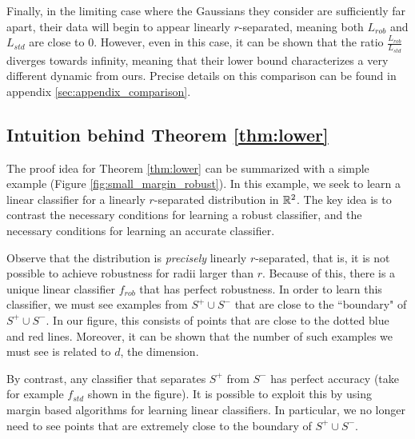 Finally, in the limiting case where the Gaussians they consider are sufficiently far apart, their data will begin to appear linearly $r$-separated, meaning both $L_{rob}$ and $L_{std}$ are close to $0$. However, even in this case, it can be shown that the ratio $\frac{L_{rob}}{L_{std}}$ diverges towards infinity, meaning that their lower bound characterizes a very different dynamic from ours. Precise details on this comparison can be found in appendix \ref{sec:appendix_comparison}.

\subsection{Intuition behind Theorem \ref{thm:lower}}

The proof idea for Theorem \ref{thm:lower} can be summarized with a simple example (Figure \ref{fig:small_margin_robust}). In this example, we seek to learn a linear classifier for a linearly $r$-separated distribution in $\mathbb R^2$. The key idea is to contrast the necessary conditions for learning a robust classifier, and the necessary conditions for learning an accurate classifier. 

Observe that the distribution is \textit{precisely} linearly $r$-separated, that is, it is not possible to achieve robustness for radii larger than $r$. Because of this, there is a unique linear classifier $f_{rob}$ that has perfect robustness. In order to learn this classifier, we must see examples from $S^+ \cup S^-$ that are close to the ``boundary" of $S^+ \cup S^-$. In our figure, this consists of points that are close to the dotted blue and red lines. Moreover, it can be shown that the number of such examples we must see is related to $d$, the dimension.

By contrast, any classifier that separates $S^+$ from $S^-$ has perfect accuracy (take for example $f_{std}$ shown in the figure). It is possible to exploit this by using margin based algorithms for learning linear classifiers. In particular, we no longer need to see points that are extremely close to the boundary of $S^+ \cup S^-$.

